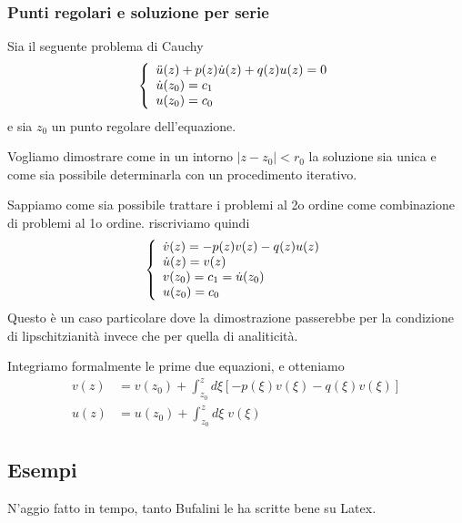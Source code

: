\newpage

\subsubsection{Punti regolari e soluzione per serie}

Sia il seguente problema di Cauchy
\begin{align}
	\triple{\ddot{u}(z) + p(z) \dot{u}(z) + q(z) u(z) = 0}{\dot{u}(z_0) = c_1 \hfill }{u(z_0) = c_0 \hfill}
\end{align}
e sia $z_0$ un punto regolare dell'equazione. 

Vogliamo dimostrare come in un intorno $|z-z_0| < r_0$ la soluzione sia unica e come sia possibile determinarla con un procedimento iterativo.

Sappiamo come sia possibile trattare i problemi al 2o ordine come combinazione di problemi al 1o ordine. riscriviamo quindi
\begin{align}
	\left\{
	\begin{array}{c}
		\dot{v}(z) = -p(z) v(z) - q(z) u(z) \\
		\dot{u}(z) = v(z) \hfill\\
		v(z_0) = c_1 = \dot{u}(z_0) \hfill\\
		u(z_0) = c_0 \hfill
	\end{array}
	\right.
\end{align}
Questo è un caso particolare dove la dimostrazione passerebbe per la condizione di lipschitzianità invece che per quella di analiticità.

Integriamo formalmente le prime due equazioni, e otteniamo
\begin{align}
	v(z) &= v(z_0) + \int_{z_0}^{z} d\xi [-p(\xi) v(\xi) - q(\xi)v(\xi)]\\
	u(z) &= u(z_0) + \int_{z_0}^{z} d\xi \; v(\xi) 
\end{align}

\newpage

\subsection{Esempi}
N'aggio fatto in tempo, tanto Bufalini le ha scritte bene su Latex.